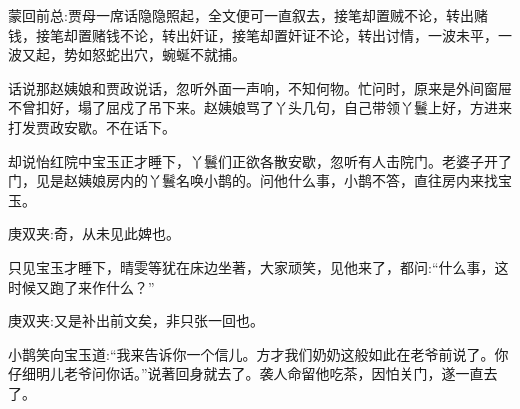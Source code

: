

\begin{parag}
    \begin{note}蒙回前总:贾母一席话隐隐照起，全文便可一直叙去，接笔却置贼不论，转出赌钱，接笔却置赌钱不论，转出奸证，接笔却置奸证不论，转出讨情，一波未平，一波又起，势如怒蛇出穴，蜿蜒不就捕。\end{note}
\end{parag}


\begin{parag}
    话说那赵姨娘和贾政说话，忽听外面一声响，不知何物。忙问时，原来是外间窗屉不曾扣好，塌了屈戍了吊下来。赵姨娘骂了丫头几句，自己带领丫鬟上好，方进来打发贾政安歇。不在话下。
\end{parag}


\begin{parag}
    却说怡红院中宝玉正才睡下，丫鬟们正欲各散安歇，忽听有人击院门。老婆子开了门，见是赵姨娘房内的丫鬟名唤小鹊的。问他什么事，小鹊不答，直往房内来找宝玉。\begin{note}庚双夹:奇，从未见此婢也。\end{note}只见宝玉才睡下，晴雯等犹在床边坐著，大家顽笑，见他来了，都问:“什么事，这时候又跑了来作什么？”\begin{note}庚双夹:又是补出前文矣，非只张一回也。\end{note}小鹊笑向宝玉道:“我来告诉你一个信儿。方才我们奶奶这般如此在老爷前说了。你仔细明儿老爷问你话。”说著回身就去了。袭人命留他吃茶，因怕关门，遂一直去了。
\end{parag}


